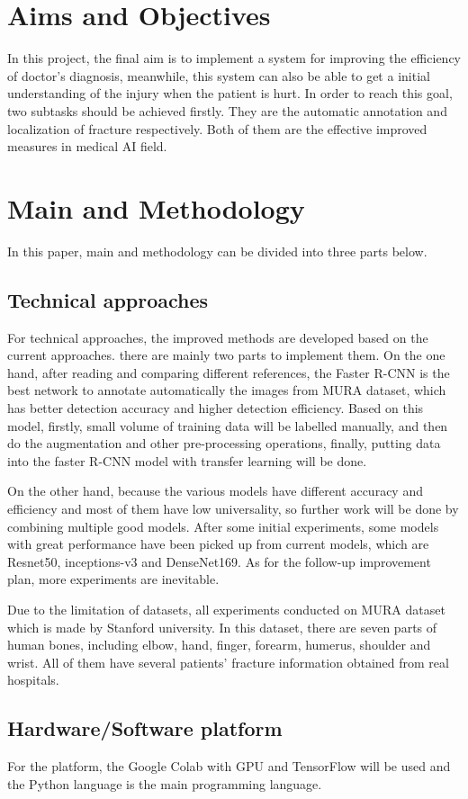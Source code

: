\documentclass[12pt,oneside,a4paper]{article}
\begin{document}
\section{Aims and Objectives}
In this project, the final aim is to implement a system for improving the efficiency of doctor’s diagnosis, meanwhile, this system can also be able to get a initial understanding of the injury when the patient is hurt. In order to reach this goal, two subtasks should be achieved firstly. They are the automatic annotation and localization of fracture respectively. Both of them are the effective improved measures in medical AI field.
\section{Main and Methodology}
In this paper, main and methodology can be divided into three parts below.
\subsection{Technical approaches}
For technical approaches, the improved methods are developed based on the current approaches. there are mainly two parts to implement them. On the one hand, after reading and comparing different references, the Faster R-CNN is the best network to annotate automatically the images from MURA dataset, which has better
detection accuracy and higher detection efficiency. Based on this model, firstly, small volume of training data will be labelled manually, and then do the augmentation and other pre-processing operations, finally, putting data into the faster R-CNN model with transfer learning will be done.

On the other hand, because the various models have different accuracy and efficiency and most of them have low universality, so further work will be done by combining multiple good models. After some initial experiments, some models with great performance have been picked up from current models, which are Resnet50, inceptions-v3 and DenseNet169. As for the follow-up improvement plan, more experiments are inevitable. 

Due to the limitation of datasets, all experiments conducted on MURA dataset which is made by Stanford university. In this dataset, there are seven parts of human bones, including elbow, hand, finger, forearm, humerus, shoulder and wrist. All of them have several patients’ fracture information obtained from real hospitals. 


\subsection{Hardware/Software platform}
For the platform, the Google Colab with GPU and TensorFlow will be used and the Python language is the main programming language. 
\end{document}
